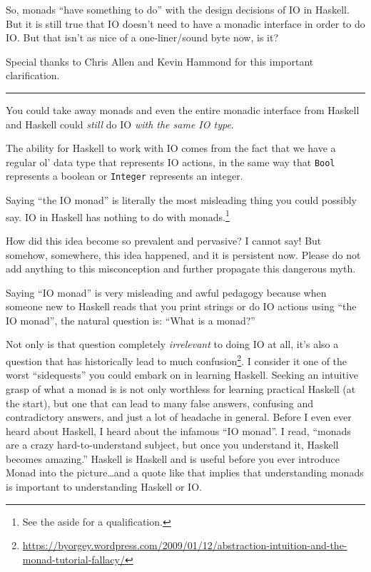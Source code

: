 \documentclass[]{article}
\renewcommand{\href}[2]{#2\footnote{\url{#1}}}
\begin{document}
So, monads ``have something to do'' with the design decisions of IO in Haskell.
But it is still true that IO doesn't need to have a monadic interface in order
to do IO. But that isn't as nice of a one-liner/sound byte now, is it?

Special thanks to Chris Allen and Kevin Hammond for this important
clarification.

\begin{center}\rule{0.5\linewidth}{\linethickness}\end{center}

You could take away monads and even the entire monadic interface from Haskell
and Haskell could \emph{still} do IO \emph{with the same IO type}.

The ability for Haskell to work with IO comes from the fact that we have a
regular ol' data type that represents IO actions, in the same way that
\texttt{Bool} represents a boolean or \texttt{Integer} represents an integer.

Saying ``the IO monad'' is literally the most misleading thing you could
possibly say. IO in Haskell has nothing to do with monads.\footnote{See the
  aside for a qualification.}

How did this idea become so prevalent and pervasive? I cannot say! But somehow,
somewhere, this idea happened, and it is persistent now. Please do not add
anything to this misconception and further propagate this dangerous myth.

Saying ``IO monad'' is very misleading and awful pedagogy because when someone
new to Haskell reads that you print strings or do IO actions using ``the IO
monad'', the natural question is: ``What is a monad?''

Not only is that question completely \emph{irrelevant} to doing IO at all, it's
also a question that has
\href{https://byorgey.wordpress.com/2009/01/12/abstraction-intuition-and-the-monad-tutorial-fallacy/}{historically
lead to much confusion}. I consider it one of the worst ``sidequests'' you could
embark on in learning Haskell. Seeking an intuitive grasp of what a monad is is
not only worthless for learning practical Haskell (at the start), but one that
can lead to many false answers, confusing and contradictory answers, and just a
lot of headache in general. Before I even ever heard about Haskell, I heard
about the infamous ``IO monad''. I read, ``monads are a crazy hard-to-understand
subject, but once you understand it, Haskell becomes amazing.'' Haskell is
Haskell and is useful before you ever introduce Monad into the
picture\ldots{}and a quote like that implies that understanding monads is
important to understanding Haskell or IO.
\end{document}
